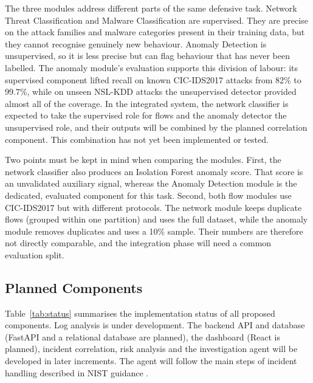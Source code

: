 The three modules address different parts of the same defensive task. Network Threat Classification and Malware Classification are supervised. They are precise on the attack families and malware categories present in their training data, but they cannot recognise genuinely new behaviour. Anomaly Detection is unsupervised, so it is less precise but can flag behaviour that has never been labelled. The anomaly module's evaluation supports this division of labour: its supervised component lifted recall on known CIC-IDS2017 attacks from 82\% to 99.7\%, while on unseen NSL-KDD attacks the unsupervised detector provided almost all of the coverage. In the integrated system, the network classifier is expected to take the supervised role for flows and the anomaly detector the unsupervised role, and their outputs will be combined by the planned correlation component. This combination has not yet been implemented or tested.

Two points must be kept in mind when comparing the modules. First, the network classifier also produces an Isolation Forest anomaly score. That score is an unvalidated auxiliary signal, whereas the Anomaly Detection module is the dedicated, evaluated component for this task. Second, both flow modules use CIC-IDS2017 but with different protocols. The network module keeps duplicate flows (grouped within one partition) and uses the full dataset, while the anomaly module removes duplicates and uses a 10\% sample. Their numbers are therefore not directly comparable, and the integration phase will need a common evaluation split.

\subsection{Planned Components}

Table~\ref{tab:status} summarises the implementation status of all proposed components. Log analysis is under development. The backend API and database (FastAPI and a relational database are planned), the dashboard (React is planned), incident correlation, risk analysis and the investigation agent will be developed in later increments. The agent will follow the main steps of incident handling described in NIST guidance \cite{nist80061r3}.

